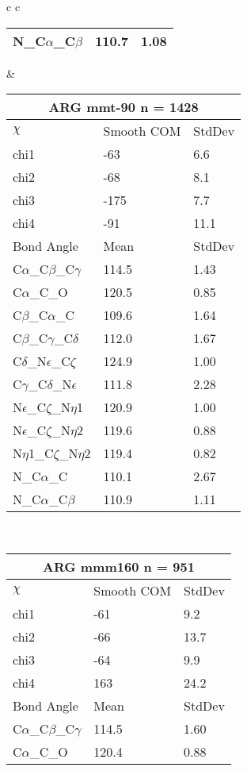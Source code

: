 \begin{longtable}{ c c }
\begin{tabular}{ l l l }
  N\_C$\alpha$\_C$\beta$ & 110.7 & 1.08\\
  \bottomrule
  \end{tabular}
  &
  \begin{tabular}{ l l l }
  \toprule
  \multicolumn{3}{c}{ARG \textbf{mmt-90} n = 1428} \\ \toprule
  $\chi$       & Smooth COM & StdDev \\ \midrule
  chi1 & -63 & 6.6 \\ 
  chi2 & -68 & 8.1 \\ 
  chi3 & -175 & 7.7 \\ 
  chi4 & -91 & 11.1 \\ \midrule
  Bond Angle   & Mean     & StdDev \\ \midrule
  C$\alpha$\_C$\beta$\_C$\gamma$ & 114.5 & 1.43\\
  C$\alpha$\_C\_O & 120.5 & 0.85\\
  C$\beta$\_C$\alpha$\_C & 109.6 & 1.64\\
  C$\beta$\_C$\gamma$\_C$\delta$ & 112.0 & 1.67\\
  C$\delta$\_N$\epsilon$\_C$\zeta$ & 124.9 & 1.00\\
  C$\gamma$\_C$\delta$\_N$\epsilon$ & 111.8 & 2.28\\
  N$\epsilon$\_C$\zeta$\_N$\eta$1 & 120.9 & 1.00\\
  N$\epsilon$\_C$\zeta$\_N$\eta$2 & 119.6 & 0.88\\
  N$\eta$1\_C$\zeta$\_N$\eta$2 & 119.4 & 0.82\\
  N\_C$\alpha$\_C & 110.1 & 2.67\\
  N\_C$\alpha$\_C$\beta$ & 110.9 & 1.11\\
  \bottomrule
  \end{tabular}
  \\
  \begin{tabular}{ l l l }
  \toprule
  \multicolumn{3}{c}{ARG \textbf{mmm160} n = 951} \\ \toprule
  $\chi$       & Smooth COM & StdDev \\ \midrule
  chi1 & -61 & 9.2 \\ 
  chi2 & -66 & 13.7 \\ 
  chi3 & -64 & 9.9 \\ 
  chi4 & 163 & 24.2 \\ \midrule
  Bond Angle   & Mean     & StdDev \\ \midrule
  C$\alpha$\_C$\beta$\_C$\gamma$ & 114.5 & 1.60\\
  C$\alpha$\_C\_O & 120.4 & 0.88\\

\end{tabular}
\end{longtable}
